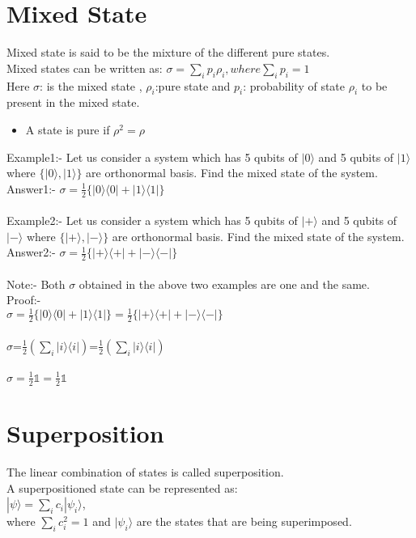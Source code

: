 \documentclass{article}
\begin{document}
\section{Mixed State}
Mixed state is said to be the mixture of the different pure states.\\
Mixed states can be written as:
$\sigma=\sum\limits_{i}p_{i}\rho_{i} , where \sum\limits_{i}p_{i}=1$\\
Here $\sigma$: is the mixed state , $\rho_{i}$:pure state and $p_{i}$: probability of state $\rho_{i}$ to be present in the mixed state.
\begin{itemize}
    \item A state is pure if $\rho^2=\rho$
\end{itemize}
Example1:-
Let us consider a system which has 5 qubits of $|0\rangle$ and 5 qubits of $|1\rangle$ where $\{|0\rangle,|1\rangle\}$ are orthonormal basis. Find the mixed state of the system.\\
Answer1:- $\sigma=\frac{1}{2}\{|0\rangle\langle0|+|1\rangle\langle1|\}$\\\\
Example2:-
Let us consider a system which has 5 qubits of $|+\rangle$ and 5 qubits of $|-\rangle$ where $\{|+\rangle,|-\rangle\}$ are orthonormal basis. Find the mixed state of the system.\\
Answer2:- $\sigma=\frac{1}{2}\{|+\rangle\langle+|+|-\rangle\langle-|\}$\\\\
Note:- Both $\sigma$ obtained in the above two examples are one and the same.\\
Proof:-\\
$\sigma=\frac{1}{2}\{|0\rangle\langle0|+|1\rangle\langle1|\}=\frac{1}{2}\{|+\rangle\langle+|+|-\rangle\langle-|\}$\\\\
$\sigma$=$\frac{1}{2}(\sum\limits_{i}|i\rangle\langle i|)$=$\frac{1}{2}(\sum\limits_{i}|i\rangle\langle i|)$\\\\
$\sigma=\frac{1}{2}\mathbb{1}=\frac{1}{2}\mathbb{1}$ 

\section{Superposition}
The linear combination of states is called superposition.\\
A superpositioned state can be represented as:\\
$|\psi\rangle=\sum\limits_{i}c_{i}|\psi_{i}\rangle$,\\
where $\sum\limits_{i}c_{i}^2=1$ and $|\psi_{i}\rangle$ are the states that are being superimposed.
\end{document}
